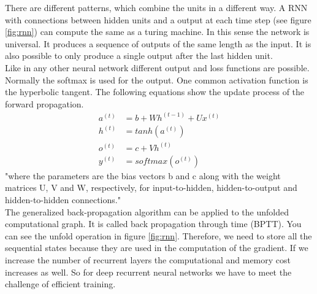 There are different patterns, which combine the units in a different way. A RNN with connections between hidden units and a output at each time step (see figure \ref{fig:rnn}) can compute the same as a turing machine. In this sense the network is universal. It produces a sequence of outputs of the same length as the input. It is also possible to only produce a single output after the last hidden unit.\\
Like in any other neural network different output and loss functions are possible. Normally the softmax is used for the output. One common activation function is the hyperbolic tangent. The following equations show the update process of the forward propagation.
\begin{align}
a^{(t)} &= b + Wh^{(t-1)} + Ux^{(t)} \\
h^{(t)} &= tanh(a^{(t)}) \\
o^{(t)} &= c + Vh^{(t)} \\
y^{(t)} &= softmax(o^{(t)})
\end{align}
"where the parameters are the bias vectors b and c along with the weight matrices U, V and W, respectively, for input-to-hidden, hidden-to-output and hidden-to-hidden connections."\cite[p.374]{DeepLearning}\\
The generalized back-propagation algorithm can be applied to the unfolded computational graph. It is called back propagation through time (BPTT). You can see the unfold operation in figure \ref{fig:rnn}. Therefore, we need to store all the sequential states because they are used in the computation of the gradient. If we increase the number of recurrent layers the computational and memory cost increases as well. So for deep recurrent neural networks we have to meet the challenge of efficient training.

